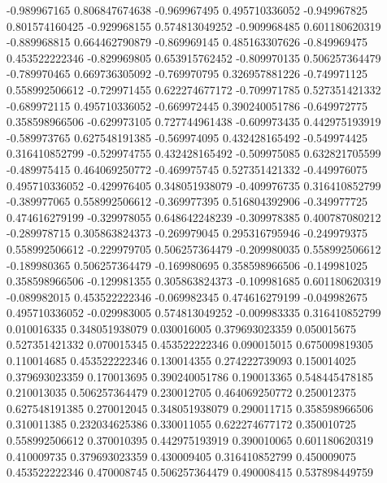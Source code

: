     -0.989967165    0.806847674638
    -0.969967495    0.495710336052
    -0.949967825    0.801574160425
    -0.929968155    0.574813049252
    -0.909968485    0.601180620319
    -0.889968815    0.664462790879
    -0.869969145    0.485163307626
    -0.849969475    0.453522222346
    -0.829969805    0.653915762452
    -0.809970135    0.506257364479
    -0.789970465    0.669736305092
    -0.769970795    0.326957881226
    -0.749971125    0.558992506612
    -0.729971455    0.622274677172
    -0.709971785    0.527351421332
    -0.689972115    0.495710336052
    -0.669972445    0.390240051786
    -0.649972775    0.358598966506
    -0.629973105    0.727744961438
    -0.609973435    0.442975193919
    -0.589973765    0.627548191385
    -0.569974095    0.432428165492
    -0.549974425    0.316410852799
    -0.529974755    0.432428165492
    -0.509975085    0.632821705599
    -0.489975415    0.464069250772
    -0.469975745    0.527351421332
    -0.449976075    0.495710336052
    -0.429976405    0.348051938079
    -0.409976735    0.316410852799
    -0.389977065    0.558992506612
    -0.369977395    0.516804392906
    -0.349977725    0.474616279199
    -0.329978055    0.648642248239
    -0.309978385    0.400787080212
    -0.289978715    0.305863824373
    -0.269979045    0.295316795946
    -0.249979375    0.558992506612
    -0.229979705    0.506257364479
    -0.209980035    0.558992506612
    -0.189980365    0.506257364479
    -0.169980695    0.358598966506
    -0.149981025    0.358598966506
    -0.129981355    0.305863824373
    -0.109981685    0.601180620319
    -0.089982015    0.453522222346
    -0.069982345    0.474616279199
    -0.049982675    0.495710336052
    -0.029983005    0.574813049252
    -0.009983335    0.316410852799
    0.010016335    0.348051938079
    0.030016005    0.379693023359
    0.050015675    0.527351421332
    0.070015345    0.453522222346
    0.090015015    0.675009819305
    0.110014685    0.453522222346
    0.130014355    0.274222739093
    0.150014025    0.379693023359
    0.170013695    0.390240051786
    0.190013365    0.548445478185
    0.210013035    0.506257364479
    0.230012705    0.464069250772
    0.250012375    0.627548191385
    0.270012045    0.348051938079
    0.290011715    0.358598966506
    0.310011385    0.232034625386
    0.330011055    0.622274677172
    0.350010725    0.558992506612
    0.370010395    0.442975193919
    0.390010065    0.601180620319
    0.410009735    0.379693023359
    0.430009405    0.316410852799
    0.450009075    0.453522222346
    0.470008745    0.506257364479
    0.490008415    0.537898449759
